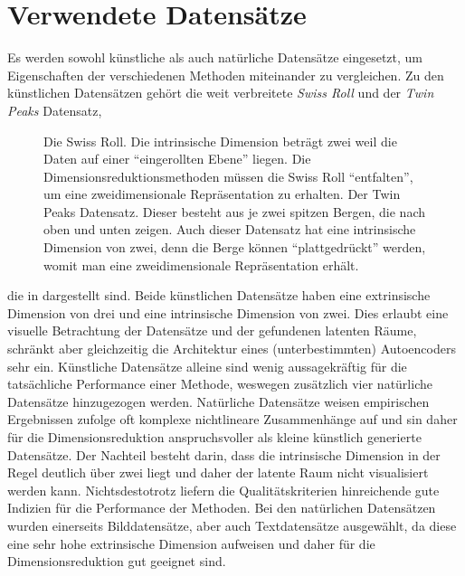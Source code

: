 \section{Verwendete Datensätze}
\label{ch:Vergleich:sec:VerwendeteDatensaetze}
Es werden sowohl künstliche als auch natürliche Datensätze eingesetzt, um Eigenschaften der
verschiedenen Methoden miteinander zu vergleichen. Zu den künstlichen Datensätzen gehört die weit
verbreitete \textit{Swiss Roll} und der \textit{Twin Peaks} Datensatz,
\begin{figure}[ht]
	\label{fig:ArtificialDatasets}
	\begin{center}
		
	\end{center}
	\caption[Künstliche Datensätze]{\figleft Die Swiss Roll. Die intrinsische Dimension beträgt zwei weil die Daten auf einer \enquote{eingerollten Ebene} liegen. Die Dimensionsreduktionsmethoden müssen die Swiss Roll \enquote{entfalten}, um eine zweidimensionale Repräsentation zu erhalten. \figright Der Twin Peaks Datensatz. Dieser besteht aus je zwei spitzen Bergen, die nach oben und unten zeigen. Auch dieser Datensatz hat eine intrinsische Dimension von zwei, denn die Berge können \enquote{plattgedrückt} werden, womit man eine zweidimensionale Repräsentation erhält.}
\end{figure}
die in  dargestellt sind.
Beide künstlichen Datensätze haben eine extrinsische Dimension von drei und eine intrinsische
Dimension von zwei. Dies erlaubt eine visuelle Betrachtung der Datensätze und der gefundenen
latenten Räume, schränkt aber gleichzeitig die Architektur eines (unterbestimmten) Autoencoders
sehr ein. Künstliche Datensätze alleine sind wenig aussagekräftig für die tatsächliche Performance
einer Methode, weswegen zusätzlich vier natürliche Datensätze hinzugezogen werden. Natürliche
Datensätze weisen empirischen Ergebnissen zufolge \addref oft komplexe nichtlineare Zusammenhänge
auf und sin daher für die Dimensionsreduktion anspruchsvoller als kleine künstlich generierte
Datensätze. Der Nachteil besteht darin, dass die intrinsische Dimension in der Regel deutlich über
zwei liegt und daher der latente Raum nicht visualisiert werden kann. Nichtsdestotrotz liefern die
Qualitätskriterien hinreichende gute Indizien für die Performance der Methoden. Bei den natürlichen
Datensätzen wurden einerseits Bilddatensätze, aber auch Textdatensätze ausgewählt, da diese eine
sehr hohe extrinsische Dimension aufweisen und daher für die Dimensionsreduktion gut geeignet sind.
